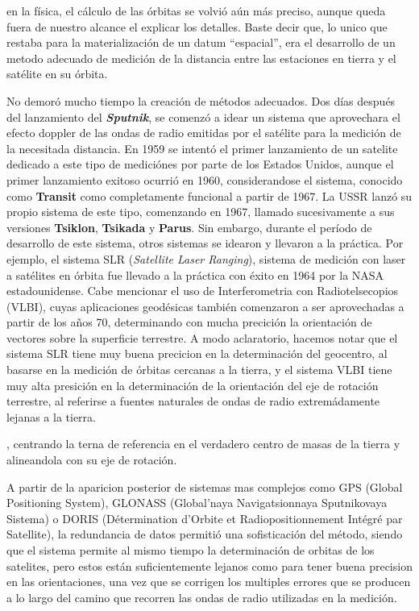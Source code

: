 \documentclass{tufte-book}
\begin{document}
 en la física, el cálculo de las órbitas se volvió aún más
preciso, aunque queda fuera de nuestro alcance el explicar los detalles. Baste decir que, lo unico que restaba para la
materialización de un datum ``espacial'', era el desarrollo de un metodo adecuado de medición de la distancia entre
las estaciones en tierra y el satélite en su órbita.

No demoró mucho tiempo la creación de métodos adecuados. Dos días después del lanzamiento del \textbf{\textit{Sputnik}},
se comenzó a idear un sistema que aprovechara el efecto doppler de las ondas de radio emitidas por el satélite
para la medición de la necesitada distancia. En 1959 se
intentó el primer lanzamiento de un satelite dedicado a este tipo de mediciónes por parte de los Estados Unidos,
aunque el primer lanzamiento exitoso ocurrió en 1960, considerandose el sistema, conocido como \textbf{Transit} como
completamente funcional a partir de 1967. La USSR lanzó su propio sistema de este tipo, comenzando en 1967, llamado
sucesivamente a sus versiones \textbf{Tsiklon}, \textbf{Tsikada} y \textbf{Parus}.
Sin embargo, durante el período de desarrollo de este sistema, otros sistemas se idearon y llevaron a la práctica.
Por ejemplo, el sistema SLR (\textit{Satellite Laser Ranging}), sistema de medición con laser a satélites en órbita
fue llevado a la práctica con éxito en 1964 por la NASA estadounidense.
Cabe mencionar el uso de Interferometria con Radiotelsecopios (VLBI), cuyas aplicaciones geodésicas también comenzaron
a ser aprovechadas a partir de los años 70, determinando con mucha precición la orientación de vectores sobre
la superficie terrestre. A modo aclaratorio, hacemos notar que el sistema SLR tiene muy buena precicion en la
determinación del geocentro, al basarse en la medición de órbitas cercanas a la tierra, y el sistema VLBI tiene
muy alta presición en la determinación de la orientación del eje de rotación terrestre, al referirse a fuentes
naturales de ondas de radio extremádamente lejanas a la tierra.

, centrando la terna de referencia en el verdadero
centro de masas de la tierra y alineandola con su eje de rotación.

A partir de la aparicion posterior de sistemas mas complejos como GPS (Global Positioning System),
GLONASS (Global'naya Navigatsionnaya Sputnikovaya Sistema) o DORIS (Détermination d'Orbite et
Radiopositionnement Intégré par Satellite), la redundancia de datos permitió una sofisticación del
método, siendo que el sistema permite al mismo tiempo la determinación de orbitas de los satelites,
pero estos están suficientemente lejanos como para tener buena precision en las orientaciones, una
vez que se corrigen los multiples errores que se producen a lo largo del camino que recorren las ondas
de radio utilizadas en la medición.
\end{document}
